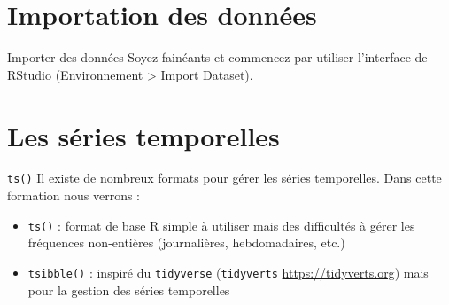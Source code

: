 \documentclass[10pt,xcolor=table,color={dvipsnames,usenames},ignorenonframetext,usepdftitle=false,french]{beamer}
\begin{document}
\hypertarget{importation-des-donnuxe9es}{%
\section{Importation des données}\label{importation-des-donnuxe9es}}

\begin{frame}{Importer des données}
\protect\hypertarget{importer-des-donnuxe9es}{}
Soyez fainéants et commencez par utiliser l'interface de RStudio
(Environnement \textgreater{} Import Dataset).
\end{frame}

\hypertarget{les-suxe9ries-temporelles}{%
\section{Les séries temporelles}\label{les-suxe9ries-temporelles}}

\begin{frame}[fragile]{\texttt{ts()}}
\protect\hypertarget{ts}{}
Il existe de nombreux formats pour gérer les séries temporelles. Dans
cette formation nous verrons :

\begin{itemize}
\item
  \texttt{ts()} : format de base R simple à utiliser mais des
  difficultés à gérer les fréquences non-entières (journalières,
  hebdomadaires, etc.)
\item
  \texttt{tsibble()} : inspiré du \texttt{tidyverse} (\texttt{tidyverts}
  \url{https://tidyverts.org}) mais pour la gestion des séries
  temporelles
\end{itemize}
\end{frame}
\end{document}
